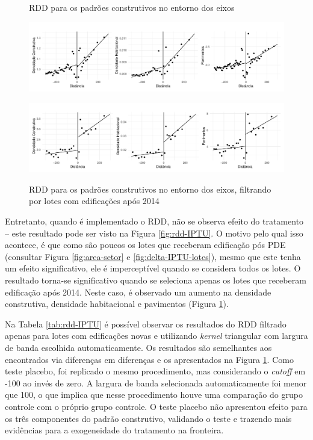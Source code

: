\begin{figure}[!h]
    \centering

    \caption{RDD para os padrões construtivos no entorno dos eixos}
    \includegraphics[width = .99\textwidth]{figuras/rdd-plot-IPTU.pdf}
    \label{fig:rdd-IPTU}

    \caption{RDD para os padrões construtivos no entorno dos eixos, filtrando por lotes com edificações após 2014}
    \includegraphics[width = .99\textwidth]{figuras/rdd-plot-IPTU-posPDE.pdf}
    \label{fig:rdd-IPTU-posPDE}
\end{figure}

Entretanto, quando é implementado o RDD, não se observa efeito do tratamento -- este resultado pode ser visto na Figura \ref{fig:rdd-IPTU}. O motivo pelo qual isso acontece, é que como são poucos os lotes que receberam edificação pós PDE (consultar Figura \ref{fig:area-setor} e \ref{fig:delta-IPTU-lotes}), mesmo que este tenha um efeito significativo, ele é imperceptível quando se considera todos os lotes. O resultado torna-se significativo quando se seleciona apenas os lotes que receberam edificação após 2014. Neste caso, é observado um aumento na densidade construtiva, densidade habitacional e pavimentos (Figura \ref{fig:rdd-IPTU-posPDE}). 





Na Tabela \ref{tab:rdd-IPTU} é possível observar os resultados do RDD filtrado apenas para lotes com edificações novas e utilizando \textit{kernel} triangular com largura de banda escolhida automaticamente. Os resultados são semelhantes aos encontrados via diferenças em diferenças e os apresentados na Figura \ref{fig:rdd-IPTU-posPDE}. Como teste placebo, foi replicado o mesmo procedimento, mas considerando o \textit{cutoff} em -100 ao invés de zero. A largura de banda selecionada automaticamente foi menor que 100, o que implica que nesse procedimento houve uma comparação do grupo controle com o próprio grupo controle. O teste placebo não apresentou efeito para os três componentes do padrão construtivo, validando o teste e trazendo mais evidências para a exogeneidade do tratamento na fronteira. 

